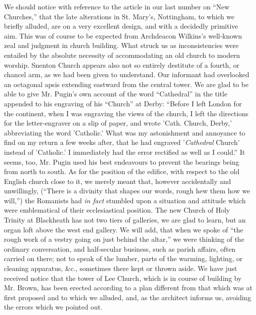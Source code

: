 We should notice with reference to the article in
our last number on ``New Churches,'' that the late alterations in St. Mary's,
Nottingham, to which we briefly alluded, are on a very excellent design,
and with a decidedly primitive aim. This was of course to be expected
from Archdeacon Wilkins's well-known zeal and judgment in church
building. What struck us as inconsistencies were entailed by the
absolute necessity of accommodating an old church to modern worship.
Snenton Church appears also not so entirely destitute of a fourth, or
chancel arm, as we had been given to understand. Our informant had
overlooked an octagonal apsis extending eastward from the central tower.
We are glad to be able to give Mr. Pugin's own account of the word ``Cathedral''
in the title appended to his engraving of his ``Church'' at Derby: ``Before
I left London for the continent, when I was engraving the views of the
church, I left the directions for the letter-engraver on a slip of
paper, and wrote 'Cath. Church, Derby,' abbreviating the word 'Catholic.'
What was my astonishment and annoyance to find on my return a few weeks
after, that he had engraved '\emph{Cathedral} Church' instead of 'Catholic.'
I immediately had the error rectified as well as I could.'' It seems,
too, Mr. Pugin used his best endeavours to prevent the bearings being
from north to south. As for the position of the edifice, with respect to
the old English church close to it, we merely meant that, however
accidentally and unwillingly, (``There is a divinity that shapes our
words, rough hew them how we will,'') the Romanists had \emph{in fact}
stumbled upon a situation and attitude which were emblematical of their
ecclesiastical position. The new Church of Holy Trinity at Blackheath
has not two tiers of galleries, we are glad to learn, but an organ loft
above the west end gallery. We will add, that when we spoke of ``the
rough work of a vestry going on just behind the altar,'' we were thinking
of the ordinary conversation, and half-secular business, such as parish
affairs, often carried on there; not to speak of the lumber, parts of
the warming, lighting, or cleaning apparatus, \&c., sometimes there
kept or thrown aside. We have just received notice that the tower of Lee
Church, which is in course of building by Mr. Brown, has been erected
according to a plan different from that which was at first proposed and
to which we alluded, and, as the architect informs us, avoiding the
errors which we pointed out.


